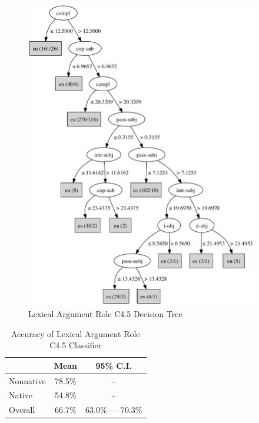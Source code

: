\documentclass[main.tex]{subfiles}
\begin{document}
\begin{figure}[ht]
\centering
\includegraphics[width=4in]{c45-lex-role.pdf}
\caption{Lexical Argument Role C4.5 Decision Tree}
\label{fig:c4.5-lex-role}
\end{figure}

\begin{table}[ht]
\centering
\caption{Accuracy of Lexical Argument Role C4.5 Classifier}
\begin{tabular}{l c c}
\toprule
& Mean & 95\% C.I.\\
\midrule
Nonnative & 78.5\% & - \\
Native & 54.8\% & - \\
Overall & 66.7\% & 63.0\% --- 70.3\% \\
\bottomrule
\end{tabular}
\label{table:lex-role-results}
\end{table}
\end{document}
